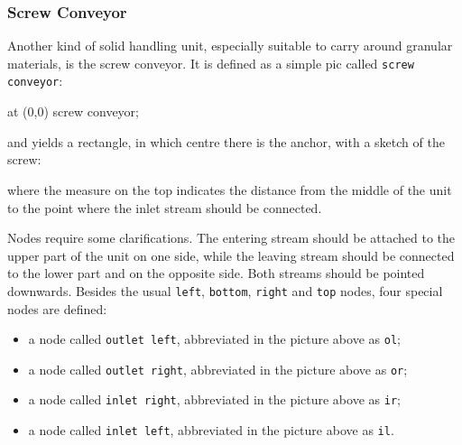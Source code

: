 \documentclass[12pt]{article}						%
\newcommand*{\chpn}[1]{\texttt{#1}}				%
\newcommand*{\chpp}[1]{\texttt{#1}}				%
\begin{document}
\subsubsection{Screw Conveyor}

Another kind of solid handling unit, especially suitable to carry around granular
materials, is the screw conveyor. It is defined as a simple pic called
\chpp{screw conveyor}:
\begin{chpcode}
	\pic at (0,0) {screw conveyor};
\end{chpcode}
and yields a rectangle, in which centre there is the anchor, with a sketch of
the screw:
\begin{center}
\end{center}
where the measure on the top indicates the distance from the middle of the
unit to the point where the inlet stream should be connected.

Nodes require some clarifications. The entering stream should be attached to the
upper part of the unit on one side, while the leaving stream should be connected
to the lower part and on the opposite side. Both streams should be pointed
downwards. Besides the usual \chpn{left}, \chpn{bottom}, \chpn{right} and
\chpn{top} nodes, four special nodes are defined:
\begin{itemize}
	\item a node called \chpn{outlet left}, abbreviated in the picture above as
		\chpn{ol};
	\item a node called \chpn{outlet right}, abbreviated in the picture above as
		\chpn{or};
	\item a node called \chpn{inlet right}, abbreviated in the picture above as
		\chpn{ir};
	\item a node called \chpn{inlet left}, abbreviated in the picture above as
		\chpn{il}.
\end{itemize}
\end{document}
